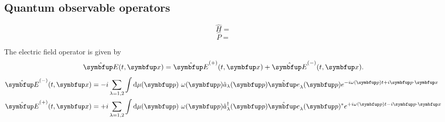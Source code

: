 \subsection{Quantum observable operators}

\begin{equation}
	\hat{H}
	=
\end{equation}
\begin{equation}
	\hat{P}
	=
\end{equation}

The electric field operator is given by
\begin{equation}
	\vu{E}(t,\vb{x})
	=
	\vu{E}^{(+)}(t,\vb{x})
	+
	\vu{E}^{(-)}(t,\vb{x})
	.
\end{equation}
\begin{align}
	\vu{E}^{(-)}(t,\vb{x})
	&=
	-i
	\sum_{\lambda=1,2}
	\int\dd{\mu(\vb{p})}
	\omega(\vb{p})
	\hat{a}_\lambda(\vb{p})
	\vu{e}_\lambda(\vb{p})
	e^{-i\omega(\vb{p})t+i\vb{p}\vdot\vb{x}}
	\\
	\vu{E}^{(+)}(t,\vb{x})
	&=
	+i
	\sum_{\lambda=1,2}
	\int\dd{\mu(\vb{p})}
	\omega(\vb{p})
	\hat{a}_\lambda^\dagger(\vb{p})
	\vu{e}_\lambda(\vb{p})^*
	e^{+i\omega(\vb{p})t-i\vb{p}\vdot\vb{x}}
\end{align}